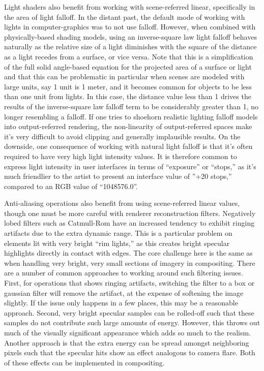 Light shaders also benefit from working with scene-referred linear, specifically in the area of light falloff. In the distant past, the default mode of working with lights in computer-graphics was to not use falloff. However, when combined with physically-based shading models, using an inverse-square law light falloff behaves naturally as the relative size of a light diminishes with the square of the distance as a light recedes from a surface, or vice versa. Note that this is a simplification of the full solid angle-based equation for the projected area of a surface or light and that this can be problematic in particular when scenes are modeled with large units, say 1 unit is 1 meter, and it becomes common for objects to be less than one unit from lights. In this case, the distance value less than 1 drives the results of the inverse-square law falloff term to be considerably greater than 1, no longer resembling a falloff. If one tries to shoehorn realistic lighting falloff models into output-referred rendering, the non-linearity of output-referred spaces make it’s very difficult to avoid clipping and generally implausible results. On the downside, one consequence of working with natural light falloff is that it’s often required to have very high light intensity values. It is therefore common to express light intensity in user interfaces in terms of “exposure” or “stops,” as it’s much friendlier to the artist to present an interface value of ”+20 stops,” compared to an RGB value of “1048576.0”.

Anti-aliasing operations also benefit from using scene-referred linear values, though one must be more careful with renderer reconstruction filters. Negatively lobed filters such as Catmull-Rom have an increased tendency to exhibit ringing artifacts due to the extra dynamic range. This is a particular problem on elements lit with very bright “rim lights,” as this creates bright specular highlights directly in contact with edges. The core challenge here is the same as when handling very bright, very small sections of imagery in compositing. There are a number of common approaches to working around such filtering issues. First, for operations that shows ringing artifacts, switching the filter to a box or gaussian filter will remove the artifact, at the expense of softening the image slightly. If the issue only happens in a few places, this may be a reasonable approach. Second, very bright specular samples can be rolled-off such that these samples do not contribute such large amounts of energy. However, this throws out much of the visually significant appearance which adds so much to the realism. Another approach is that the extra energy can be spread amongst neighboring pixels such that the specular hits show an effect analogous to camera flare. Both of these effects can be implemented in compositing. 

